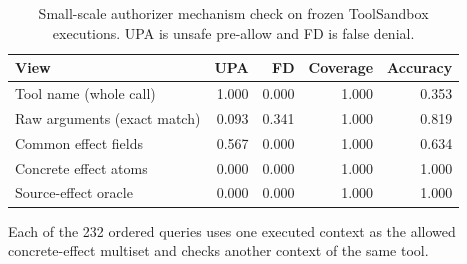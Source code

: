 \begin{table}[t]
\centering
\small
\caption{Small-scale authorizer mechanism check on frozen ToolSandbox executions. UPA is unsafe pre-allow and FD is false denial.}
\label{tab:concrete-atom-authorizer}
\begin{tabular}{lrrrr}
\toprule
View & UPA & FD & Coverage & Accuracy \\
\midrule
Tool name (whole call) & 1.000 & 0.000 & 1.000 & 0.353 \\
Raw arguments (exact match) & 0.093 & 0.341 & 1.000 & 0.819 \\
Common effect fields & 0.567 & 0.000 & 1.000 & 0.634 \\
Concrete effect atoms & 0.000 & 0.000 & 1.000 & 1.000 \\
Source-effect oracle & 0.000 & 0.000 & 1.000 & 1.000 \\
\bottomrule
\end{tabular}
\vspace{2pt}\parbox{0.98\linewidth}{\footnotesize Each of the 232 ordered queries uses one executed context as the allowed concrete-effect multiset and checks another context of the same tool.}
\end{table}
